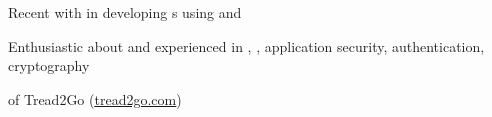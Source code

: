 

\begin{cvparagraph}
        \begin{summaryitems}
            \item \begin{center} Recent  with  in developing s using  and  \end{center}
            \item \begin{center} Enthusiastic about and experienced in , , application security, authentication, cryptography \end{center}
            \item \begin{center}  of Tread2Go (\underline{\href{https://www.tread2go.com}{tread2go.com}}) \end{center}
        \end{summaryitems}
\end{cvparagraph}


\vspace{-3mm}
